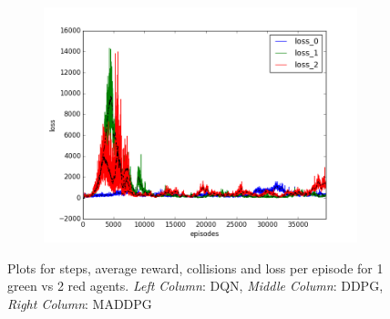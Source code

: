 \begin{figure}[t]
\begin{subfigure}[t]{\figscale\linewidth}
    \includegraphics[width=1.5\textwidth]
    {../results/maddpg_2vs1/loss.png}
    \label{fig:maddpg-2vs1-loss}
  \end{subfigure}

  \caption{Plots for steps, average reward, collisions and loss per episode for 1 green vs 2 red agents. \textit{Left Column}: DQN, \textit{Middle Column}: DDPG, \textit{Right Column}: MADDPG}
  \label{fig:2vs1}
\end{figure}
\FloatBarrier
